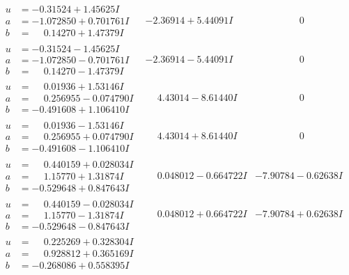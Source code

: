 \documentclass[1p]{elsarticle_modified}
\theoremstyle{definition}
\begin{document}
$$\begin{array}{c|c|c}
\begin{aligned}
u &= -0.31524 + 1.45625 I \\
a &= -1.072850 + 0.701761 I \\
b &= \phantom{-}0.14270 + 1.47379 I\end{aligned}
 & -2.36914 + 5.44091 I & \phantom{-0.000000 } 0 \\ \hline\begin{aligned}
u &= -0.31524 - 1.45625 I \\
a &= -1.072850 - 0.701761 I \\
b &= \phantom{-}0.14270 - 1.47379 I\end{aligned}
 & -2.36914 - 5.44091 I & \phantom{-0.000000 } 0 \\ \hline\begin{aligned}
u &= \phantom{-}0.01936 + 1.53146 I \\
a &= \phantom{-}0.256955 - 0.074790 I \\
b &= -0.491608 + 1.106410 I\end{aligned}
 & \phantom{-}4.43014 - 8.61440 I & \phantom{-0.000000 } 0 \\ \hline\begin{aligned}
u &= \phantom{-}0.01936 - 1.53146 I \\
a &= \phantom{-}0.256955 + 0.074790 I \\
b &= -0.491608 - 1.106410 I\end{aligned}
 & \phantom{-}4.43014 + 8.61440 I & \phantom{-0.000000 } 0 \\ \hline\begin{aligned}
u &= \phantom{-}0.440159 + 0.028034 I \\
a &= \phantom{-}1.15770 + 1.31874 I \\
b &= -0.529648 + 0.847643 I\end{aligned}
 & \phantom{-}0.048012 - 0.664722 I & -7.90784 - 0.62638 I \\ \hline\begin{aligned}
u &= \phantom{-}0.440159 - 0.028034 I \\
a &= \phantom{-}1.15770 - 1.31874 I \\
b &= -0.529648 - 0.847643 I\end{aligned}
 & \phantom{-}0.048012 + 0.664722 I & -7.90784 + 0.62638 I \\ \hline\begin{aligned}
u &= \phantom{-}0.225269 + 0.328304 I \\
a &= \phantom{-}0.928812 + 0.365169 I \\
b &= -0.268086 + 0.558395 I\end{aligned}

\end{array}$$
\end{document}
